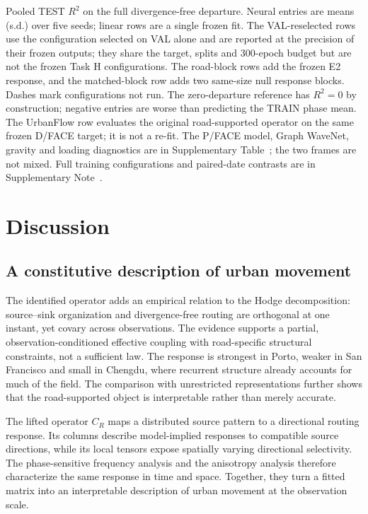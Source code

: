\documentclass[11pt]{article}
\begin{document}
\begin{table}[!t]
\parbox{\textwidth}{\footnotesize Pooled TEST $R^2$ on the full divergence-free departure. Neural entries are means (s.d.) over five seeds; linear rows are a single frozen fit. The VAL-reselected rows use the configuration selected on VAL alone and are reported at the precision of their frozen outputs; they share the target, splits and 300-epoch budget but are not the frozen Task H configurations. The road-block rows add the frozen E2 response, and the matched-block row adds two same-size null response blocks. Dashes mark configurations not run. The zero-departure reference has $R^2=0$ by construction; negative entries are worse than predicting the TRAIN phase mean. The UrbanFlow row evaluates the original road-supported operator on the same frozen D/FACE target; it is not a re-fit. The P/FACE model, Graph WaveNet, gravity and loading diagnostics are in Supplementary Table~; the two frames are not mixed. Full training configurations and paired-date contrasts are in Supplementary Note~.}
\end{table}

\section{Discussion}\label{sec:disc}
\subsection{A constitutive description of urban movement}

The identified operator adds an empirical relation to the Hodge decomposition: source--sink organization and divergence-free routing are orthogonal at one instant, yet covary across observations. The evidence supports a partial, observation-conditioned effective coupling with road-specific structural constraints, not a sufficient law. The response is strongest in Porto, weaker in San Francisco and small in Chengdu, where recurrent structure already accounts for much of the field. The comparison with unrestricted representations further shows that the road-supported object is interpretable rather than merely accurate.

The lifted operator $C_R$ maps a distributed source pattern to a directional routing response. Its columns describe model-implied responses to compatible source directions, while its local tensors expose spatially varying directional selectivity. The phase-sensitive frequency analysis and the anisotropy analysis therefore characterize the same response in time and space. Together, they turn a fitted matrix into an interpretable description of urban movement at the observation scale.
\end{document}
